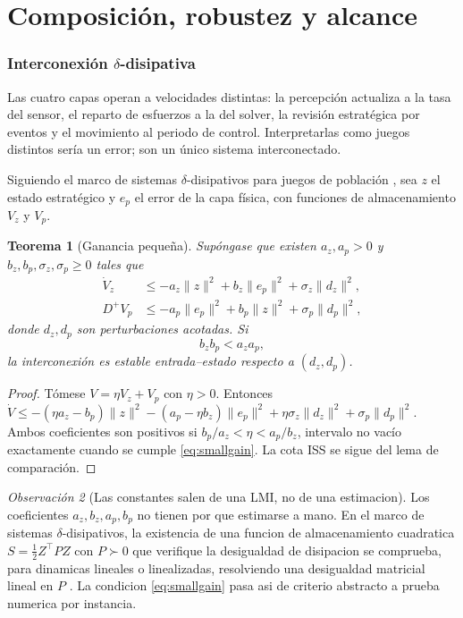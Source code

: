 \documentclass[11pt,a4paper]{article}
\theoremstyle{plain}
\newtheorem{teorema}{Teorema}[section]
\theoremstyle{definition}
\theoremstyle{remark}
\newtheorem{observacion}[teorema]{Observación}
\begin{document}


\part{Composición, robustez y alcance}

\section{Interconexión $\delta$-disipativa}
\label{sec:interconexion}

Las cuatro capas operan a velocidades distintas: la percepción actualiza a la
tasa del sensor, el reparto de esfuerzos a la del solver, la revisión
estratégica por eventos y el movimiento al periodo de control. Interpretarlas
como juegos distintos sería un error; son un único sistema interconectado.

Siguiendo el marco de sistemas $\delta$-disipativos para juegos de población
\cite{fox2013population,park2019payoff}, sea $z$ el estado estratégico y $e_p$
el error de la capa física, con funciones de almacenamiento $V_z$ y $V_p$.

\begin{teorema}[Ganancia pequeña]
\label{th:smallgain}
Supóngase que existen $a_z,a_p>0$ y $b_z,b_p,\sigma_z,\sigma_p\ge0$ tales que
\begin{align}
  \dot V_z &\le -a_z\|z\|^{2}+b_z\|e_p\|^{2}+\sigma_z\|d_z\|^{2},\\
  D^{+}V_p &\le -a_p\|e_p\|^{2}+b_p\|z\|^{2}+\sigma_p\|d_p\|^{2},
\end{align}
donde $d_z,d_p$ son perturbaciones acotadas. Si
\begin{equation}
  b_z b_p<a_z a_p ,
  \label{eq:smallgain}
\end{equation}
la interconexión es estable entrada--estado respecto a $(d_z,d_p)$.
\end{teorema}

\begin{proof}
Tómese $V=\eta V_z+V_p$ con $\eta>0$. Entonces
$\dot V\le-(\eta a_z-b_p)\|z\|^2-(a_p-\eta b_z)\|e_p\|^2+\eta\sigma_z\|d_z\|^2+\sigma_p\|d_p\|^2$.
Ambos coeficientes son positivos si $b_p/a_z<\eta<a_p/b_z$, intervalo no vacío
exactamente cuando se cumple \eqref{eq:smallgain}. La cota ISS se sigue del
lema de comparación.
\end{proof}

\begin{observacion}[Las constantes salen de una LMI, no de una estimacion]
\label{obs:lmi}
Los coeficientes $a_z,b_z,a_p,b_p$ no tienen por que estimarse a mano. En el
marco de sistemas $\delta$-disipativos, la existencia de una funcion de
almacenamiento cuadratica $S=\tfrac12 Z^{\!\top}\!PZ$ con $P\succ0$ que
verifique la desigualdad de disipacion se comprueba, para dinamicas lineales o
linealizadas, resolviendo una desigualdad matricial lineal en $P$
\cite[Lema~3.1 y Cor.~3.1]{martinezPiazuelo2025gne}. La condicion
\eqref{eq:smallgain} pasa asi de criterio abstracto a prueba numerica por
instancia.
\end{observacion}
\end{document}
